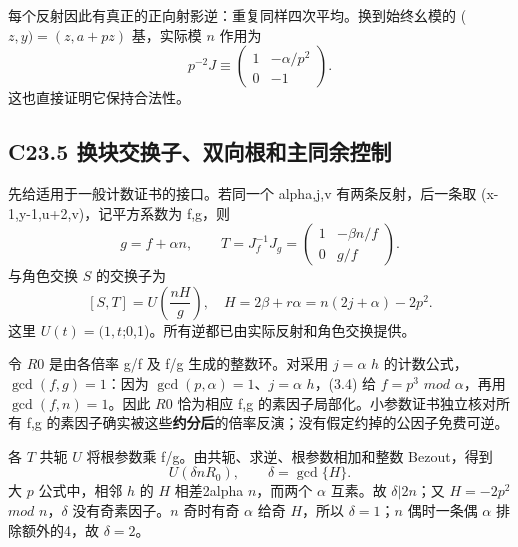 \documentclass[11pt,a4paper]{article}
\theoremstyle{definition}
\numberwithin{equation}{section}
\begin{document}
{每个反射因此有真正的正向射影逆：重复同样四次平均。换到始终幺模的} {(\ensuremath{z,y)=(z,a+pz)}} {基，实际模} {\ensuremath{n}} {作用为} \[
p^{-2}J\equiv
\begin{pmatrix}1&-\alpha/p^2\\0&-1\end{pmatrix}.
\tag{C23.3.5}
\] {这也直接证明它保持合法性。}

\subsection*{\texorpdfstring{{C23.5} {换块交换子、双向根和主同余控制}}{C23.5 换块交换子、双向根和主同余控制}}\label{C23-h153}

{先给适用于一般计数证书的接口。若同一个} {alpha,j,v} {有两条反射，后一条取} {(x-1,y-1,u+2,v)，记平方系数为} {f,g，则} \[
g=f+\alpha n,\qquad
T=J_f^{-1}J_g=
\begin{pmatrix}1&-\beta n/f\\0&g/f\end{pmatrix}.
\tag{C23.5.1}
\] {与角色交换} {\ensuremath{S}} {的交换子为} \[
\boxed{[S,T]=U\!\left(\frac{nH}{g}\right),\quad
H=2\beta+r\alpha=n(2j+\alpha)-2p^2.}
\tag{C23.5.2}
\] {这里} {\ensuremath{U(t)=(1,t};0,1)。所有逆都已由实际反射和角色交换提供。}

{令} {\ensuremath{R0}} {是由各倍率} {g/f} {及} {f/g} {生成的整数环。对采用} {\ensuremath{j=\alpha }} {\ensuremath{h}} {的计数公式，\ensuremath{\operatorname{gcd}(f,g)=1}：因为} {\ensuremath{\operatorname{gcd}(p,\alpha )=1}、\ensuremath{j=\alpha }} {\ensuremath{h}，(3.4)} {给} {\ensuremath{f=p^{3}}} {\ensuremath{mod}} {\ensuremath{\alpha }，再用} {\ensuremath{\operatorname{gcd}(f,n)=1}。因此} {\ensuremath{R0}} {恰为相应} {f,g} {的素因子局部化。小参数证书独立核对所有} {f,g} {的素因子确实被这些}\textbf{{约分后}}{的倍率反演；没有假定约掉的公因子免费可逆。}

{各} {\ensuremath{T}} {共轭} {\ensuremath{U}} {将根参数乘} {f/g。由共轭、求逆、根参数相加和整数} {Bezout，得到} \[
U(\delta nR_0),\qquad\delta=\gcd\{H\}.
\tag{C23.5.3}
\] {大} {\ensuremath{p}} {公式中，相邻} {\ensuremath{h}} {的} {\ensuremath{H}} {相差2alpha} {\ensuremath{n}，而两个} {\ensuremath{\alpha }} {互素。故} {\ensuremath{\delta |2n}；又} {\ensuremath{H=-2p^{2}}} {\ensuremath{mod}} {\ensuremath{n}，\ensuremath{\delta }} {没有奇素因子。\ensuremath{n}} {奇时有奇} {\ensuremath{\alpha }} {给奇} {\ensuremath{H}，所以} {\ensuremath{\delta =1}；\ensuremath{n}} {偶时一条偶} {\ensuremath{\alpha }} {排除额外的4，故} {\ensuremath{\delta =2}。}
\end{document}
